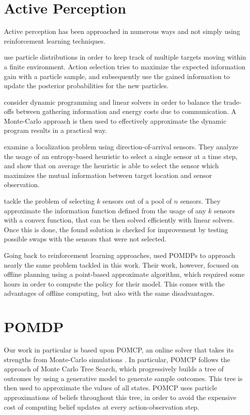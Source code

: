 \section{Active Perception}
Active perception has been approached in numerous ways and not simply using reinforcement learning
techniques.

\cite{cit:relworktanks} use particle distributions in order to keep track of multiple targets moving
within a finite environment. Action selection tries to maximize the expected information gain with a
particle sample, and subsequently use the gained information to update the posterior probabilities
for the new particles.

\cite{cit:relworklagrange} consider dynamic programming and linear solvers in order to balance the
trade-offs between gathering information and energy costs due to communication. A Monte-Carlo
approach is then used to effectively approximate the dynamic program results in a practical way.

\cite{cit:relworkentropy} examine a localization problem using direction-of-arrival sensors. They
analyze the usage of an entropy-based heuristic to select a single sensor at a time step, and show
that on average the heuristic is able to select the sensor which maximizes the mutual information
between target location and sensor observation.

\cite{cit:relworkconvex} tackle the problem of selecting $k$ sensors out of a pool of $n$ sensors.
They approximate the information function defined from the usage of any $k$ sensors with a convex
function, that can be then solved efficiently with linear solvers. Once this is done, the found
solution is checked for improvement by testing possible swaps with the sensors that were not selected.

Going back to reinforcement learning approaches, \cite{cit:relworkspaan} used POMDPs to approach
nearly the same problem tackled in this work. Their work, however, focused on offline planning using
a point-based approximate algorithm, which required some hours in order to compute the policy for
their model. This comes with the advantages of offline computing, but also with the same
disadvantages.

\section{POMDP}

Our work in particular is based upon POMCP, an online solver that takes its strengths from
Monte-Carlo simulations \cite{cit:pomcp}. In particular, POMCP follows the approach of Monte Carlo
Tree Search, which progressively builds a tree of outcomes by using a generative model to generate
sample outcomes. This tree is then used to approximate the values of all states. POMCP uses particle
approximations of beliefs throughout this tree, in order to avoid the expensive cost of computing
belief updates at every action-observation step.


